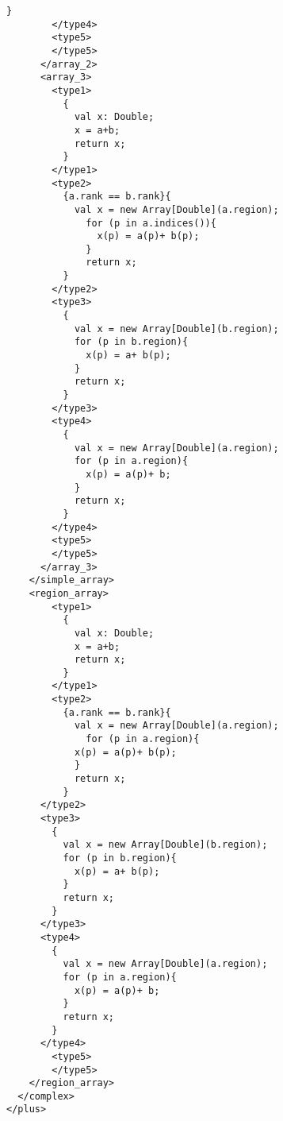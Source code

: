 \begin{lstlisting}[language=X10]
          }
        </type4>
        <type5>
        </type5>
      </array_2>
      <array_3>
        <type1>
          {
            val x: Double;
            x = a+b;
            return x;
          }
        </type1>
        <type2>
          {a.rank == b.rank}{
            val x = new Array[Double](a.region);
              for (p in a.indices()){
                x(p) = a(p)+ b(p);
              }
              return x;
          } 
        </type2>
        <type3>
          {
            val x = new Array[Double](b.region);
            for (p in b.region){
              x(p) = a+ b(p);
            }
            return x;
          }
        </type3>
        <type4>
          {
            val x = new Array[Double](a.region);
            for (p in a.region){
              x(p) = a(p)+ b;
            }
            return x;
          }
        </type4>
        <type5>
        </type5>
      </array_3>
    </simple_array>
    <region_array>
        <type1>
          {
            val x: Double;
            x = a+b;
            return x;
          }
        </type1>
        <type2>
          {a.rank == b.rank}{
            val x = new Array[Double](a.region);
              for (p in a.region){
            x(p) = a(p)+ b(p);
            }
            return x;
          } 
      </type2>
      <type3>
        {
          val x = new Array[Double](b.region);
          for (p in b.region){
            x(p) = a+ b(p);
          }
          return x;
        }
      </type3>
      <type4>
        {
          val x = new Array[Double](a.region);
          for (p in a.region){
            x(p) = a(p)+ b;
          }
          return x;
        }
      </type4>
        <type5>
        </type5>
    </region_array>
  </complex>
</plus>
\end{lstlisting}
